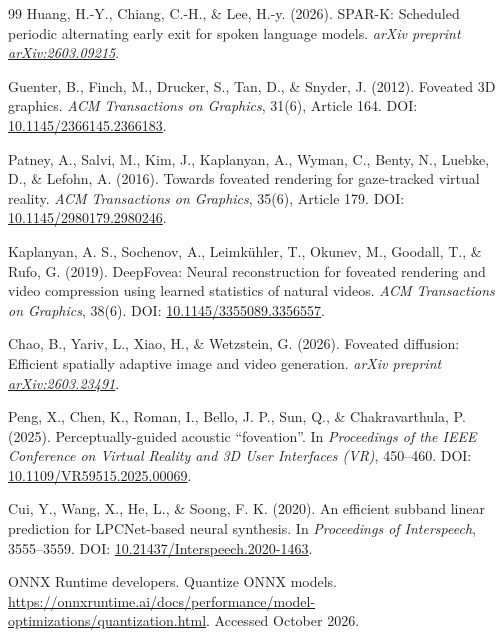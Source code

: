 \documentclass[11pt,a4paper]{article}
\begin{document}
\begin{thebibliography}{99}
Huang, H.-Y., Chiang, C.-H., \& Lee, H.-y. (2026).
SPAR-K: Scheduled periodic alternating early exit for spoken language models.
\textit{arXiv preprint \href{https://arxiv.org/abs/2603.09215}{arXiv:2603.09215}}.

Guenter, B., Finch, M., Drucker, S., Tan, D., \& Snyder, J. (2012).
Foveated 3D graphics.
\textit{ACM Transactions on Graphics}, 31(6), Article 164.
DOI: \href{https://doi.org/10.1145/2366145.2366183}{10.1145/2366145.2366183}.

Patney, A., Salvi, M., Kim, J., Kaplanyan, A., Wyman, C., Benty, N., Luebke, D., \& Lefohn, A. (2016).
Towards foveated rendering for gaze-tracked virtual reality.
\textit{ACM Transactions on Graphics}, 35(6), Article 179.
DOI: \href{https://doi.org/10.1145/2980179.2980246}{10.1145/2980179.2980246}.

Kaplanyan, A. S., Sochenov, A., Leimk\"uhler, T., Okunev, M., Goodall, T., \& Rufo, G. (2019).
DeepFovea: Neural reconstruction for foveated rendering and video compression using learned statistics of natural videos.
\textit{ACM Transactions on Graphics}, 38(6).
DOI: \href{https://doi.org/10.1145/3355089.3356557}{10.1145/3355089.3356557}.

Chao, B., Yariv, L., Xiao, H., \& Wetzstein, G. (2026).
Foveated diffusion: Efficient spatially adaptive image and video generation.
\textit{arXiv preprint \href{https://arxiv.org/abs/2603.23491}{arXiv:2603.23491}}.

Peng, X., Chen, K., Roman, I., Bello, J. P., Sun, Q., \& Chakravarthula, P. (2025).
Perceptually-guided acoustic ``foveation''.
In \textit{Proceedings of the IEEE Conference on Virtual Reality and 3D User Interfaces (VR)}, 450--460.
DOI: \href{https://doi.org/10.1109/VR59515.2025.00069}{10.1109/VR59515.2025.00069}.


Cui, Y., Wang, X., He, L., \& Soong, F. K. (2020).
An efficient subband linear prediction for LPCNet-based neural synthesis.
In \textit{Proceedings of Interspeech}, 3555--3559.
DOI: \href{https://doi.org/10.21437/Interspeech.2020-1463}{10.21437/Interspeech.2020-1463}.

ONNX Runtime developers. Quantize ONNX models.
\url{https://onnxruntime.ai/docs/performance/model-optimizations/quantization.html}.
Accessed October 2026.
\end{thebibliography}
\end{document}
